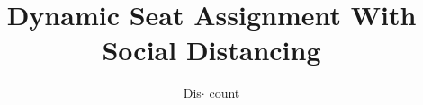 \documentclass{article}
\title{Dynamic Seat Assignment With Social Distancing}
\author{Dis$\cdot$ count}
\begin{document}
\maketitle{}























\end{document}
